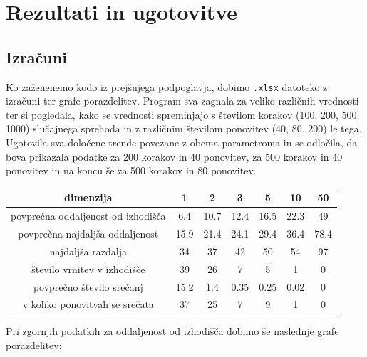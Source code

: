\documentclass[a4paper,oneside,12pt]{article}
\begin{document}
\section{Rezultati in ugotovitve}
\subsection{Izračuni}

Ko zaženenemo kodo iz prejšnjega podpoglavja, dobimo \texttt{.xlsx} datoteko z izračuni ter grafe porazdelitev. Program sva zagnala za veliko različnih vrednosti ter si pogledala, kako se vrednosti spreminjajo s številom korakov (100, 200, 500, 1000) slučajnega sprehoda in z različnim številom ponovitev (40, 80, 200) le tega. 
Ugotovila sva določene trende povezane z obema parametroma in se odločila, 
da bova prikazala podatke za 200 korakov in 40 ponovitev, za 500 korakov in 40 ponovitev in na koncu še za 500 korakov in 80 ponovitev.
\bigskip

\begin{center}
\begin{tabular}{|c| c c c c c c|} 
\hline
dimenzija & 1 & 2 & 3 & 5 & 10 & 50 \\ [0.5ex] 
\hline \hline 
povprečna oddaljenost od izhodišča & 6.4 & 10.7 & 12.4 & 16.5 & 22.3 & 49 \\ [0.5ex] 
\hline
povprečna najdaljša oddaljenost & 15.9 & 21.4 & 24.1 & 29.4 & 36.4 & 78.4  \\ [0.5ex] 
\hline
najdaljša razdalja & 34 & 37 & 42 & 50 & 54 & 97 \\ [0.5ex] 
\hline
število vrnitev v izhodišče & 39 & 26 & 7 & 5 & 1 & 0 \\ [0.5ex] 
\hline
povprečno število srečanj & 15.2 & 1.4 & 0.35 & 0.25 & 0.02 & 0 \\ [0.5ex] 
\hline
v koliko ponovitvah se srečata & 37 & 25 & 7 & 9 & 1 & 0 \\ [0.5ex] 
\hline
\end{tabular}
\end{center}
\bigskip
Pri zgornjih podatkih za oddaljenost od izhodišča dobimo še naslednje grafe porazdelitev:
\end{document}
